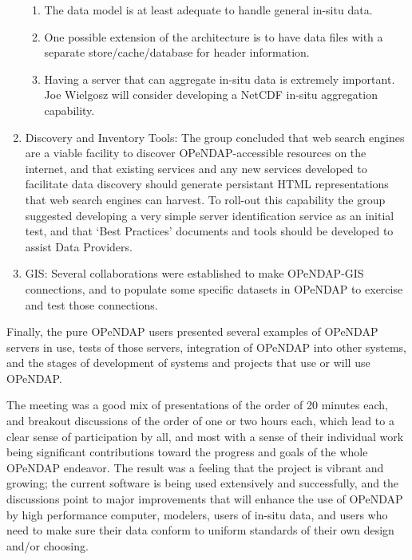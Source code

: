 \begin{enumerate}
\begin{enumerate}
     \item The data model is at least adequate to handle general
       in-situ data.
       
     \item One possible extension of the architecture is to have data
       files with a separate store/cache/database for header
       information.
       
     \item Having a server that can aggregate in-situ data is
       extremely important.  Joe Wielgosz will consider developing a
       \ac{NetCDF} in-situ aggregation capability.
     \end{enumerate}
   
   \item Discovery and Inventory Tools: The group concluded that web
     search engines are a viable facility to discover
     OPeNDAP-accessible resources on the internet, and that existing
     services and any new services developed to facilitate data
     discovery should generate persistant HTML representations that
     web search engines can harvest.  To roll-out this capability the
     group suggested developing a very simple server identification
     service as an initial test, and that `Best Practices' documents
     and tools should be developed to assist Data Providers.

     
   \item \ac{GIS}: Several collaborations were established to make
     \ac{OPeNDAP}-\ac{GIS} connections, and to populate some specific
     datasets in \ac{OPeNDAP} to exercise and test those connections.
   \end{enumerate}


Finally, the pure \ac{OPeNDAP} users presented several examples
of \ac{OPeNDAP} servers in use, tests of those servers, 
integration of \ac{OPeNDAP} into other systems, and the stages
of development of systems and projects that use or will use
\ac{OPeNDAP}.

The meeting was a good mix of presentations of the order of
20 minutes each, and breakout discussions of the order of one
or two hours each, which lead to a clear sense of participation
by all, and most with a sense of their individual work being 
significant contributions toward the progress and goals of the
whole \ac{OPeNDAP} endeavor.  The result was a feeling that the
project is vibrant and growing;  the current software is being
used extensively and successfully, and the discussions point
to major improvements that will enhance the use of \ac{OPeNDAP}
by high performance computer, modelers, users of in-situ data,
and users who need to make sure their data conform to uniform
standards of their own design and/or choosing.

%
%
%
%
%

